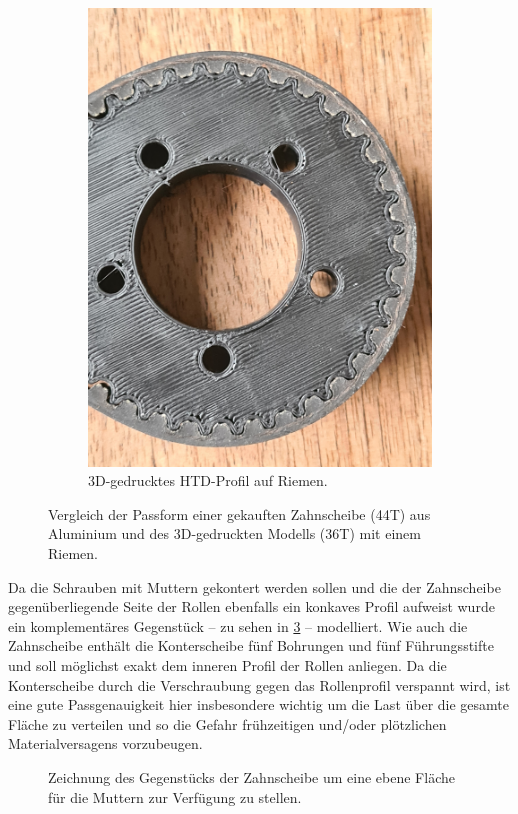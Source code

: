 \begin{figure}[h]
\begin{subfigure}{.49\textwidth}
				\includegraphics[width=\textwidth]{Assets/Printed-HTD_tooth_fit.jpg}
				\caption{3D-gedrucktes HTD-Profil auf Riemen.}
				\label{subfig:printed HTD}
			\end{subfigure}
			\caption{Vergleich der Passform einer gekauften Zahnscheibe (44T) aus Aluminium und des 3D-gedruckten Modells (36T) mit einem Riemen.}
			\label{fig:HTD profiles comparison}
		\end{figure}\par\medskip
		Da die Schrauben mit Muttern gekontert werden sollen und die der Zahnscheibe gegenüberliegende Seite der Rollen ebenfalls ein konkaves Profil aufweist wurde ein komplementäres Gegenstück -- zu sehen in \cref{fig:orangatang kegel flat face} -- modelliert.
		Wie auch die Zahnscheibe enthält die Konterscheibe fünf Bohrungen und fünf Führungsstifte und soll möglichst exakt dem inneren Profil der Rollen anliegen.
		Da die Konterscheibe durch die Verschraubung gegen das Rollenprofil verspannt wird, ist eine gute Passgenauigkeit hier insbesondere wichtig um die Last über die gesamte Fläche zu verteilen und so die Gefahr frühzeitigen und/oder plötzlichen Materialversagens vorzubeugen.
		\begin{figure}[h]
			\centering
			
			\caption[Zeichnung des Gegenstücks der Zahnscheibe]{Zeichnung des Gegenstücks der Zahnscheibe um eine ebene Fläche für die Muttern zur Verfügung zu stellen.}
			\label{fig:orangatang kegel flat face}
		\end{figure}
		
